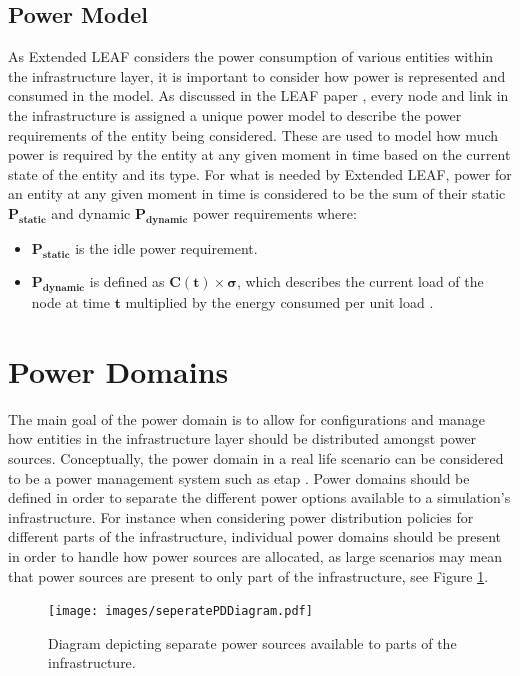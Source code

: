 \documentclass{l4proj}
\begin{document}
\subsection{Power Model}\label{subsec:power-model}
As Extended LEAF considers the power consumption of various entities within the infrastructure layer, it is important to consider how power is represented and consumed in the model.
As discussed in the LEAF paper \cite{leaf2021}, every node and link in the infrastructure is assigned a unique power model to describe the power requirements of the entity being considered.
These are used to model how much power is required by the entity at any given moment in time based on the current state of the entity and its type.
For what is needed by Extended LEAF, power for an entity at any given moment in time is considered to be the sum of their static $\mathbf{P_{static}}$ and dynamic $\mathbf{P_{dynamic}}$ power requirements where:
\begin{itemize}
    \item $\mathbf{P_{static}}$ is the idle power requirement.\\
    \item $\mathbf{P_{dynamic}}$ is defined as $\mathbf{C(t) \times \sigma}$, which describes the current load of the node at time $\mathbf{t}$ multiplied by the energy consumed per unit load \citep{leaf2021}.
\end{itemize}

\section{Power Domains}\label{sec:power-domains}
The main goal of the power domain is to allow for configurations and manage how entities in the infrastructure layer should be distributed amongst power sources.
Conceptually, the power domain in a real life scenario can be considered to be a power management system such as etap \citep{etap}.
Power domains should be defined in order to separate the different power options available to a simulation's infrastructure.
For instance when considering power distribution policies for different parts of the infrastructure, individual power domains should be present in order to handle how power sources are allocated, as large scenarios may mean that power sources are present to only part of the infrastructure, see Figure \ref{fig:seperatePDs}.
\begin{figure}[htbp]
    \centering
    \texttt{[image: images/seperatePDDiagram.pdf]}
    ~
    \caption{Diagram depicting separate power sources available to parts of the infrastructure.}
    \label{fig:seperatePDs}
\end{figure}
\end{document}
